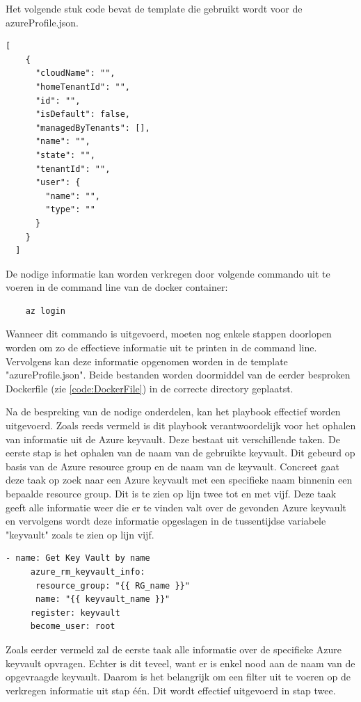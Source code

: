 Het volgende stuk code bevat de template die gebruikt wordt voor de azureProfile.json.
\begin{lstlisting}[caption={azureProfile.json}]
    [
    {
      "cloudName": "",
      "homeTenantId": "",
      "id": "",
      "isDefault": false,
      "managedByTenants": [],
      "name": "",
      "state": "",
      "tenantId": "",
      "user": {
        "name": "",
        "type": ""
      }
    }
  ]
\end{lstlisting}
De nodige informatie kan worden verkregen door volgende commando uit te voeren in de command line van de docker container: 
\begin{lstlisting}
    az login
\end{lstlisting}
Wanneer dit commando is uitgevoerd, moeten nog enkele stappen doorlopen worden om zo de effectieve informatie uit te printen in de command line. Vervolgens kan deze informatie opgenomen worden in de template "azureProfile.json". Beide bestanden worden doormiddel van de eerder besproken Dockerfile (zie \ref{code:DockerFile}) in de correcte directory geplaatst.

Na de bespreking van de nodige onderdelen, kan het playbook effectief worden uitgevoerd. Zoals reeds vermeld is dit playbook verantwoordelijk voor het ophalen van informatie uit de Azure keyvault. Deze bestaat uit verschillende taken. 
De eerste stap is het ophalen van de naam van de gebruikte keyvault. Dit gebeurd op basis van de Azure resource group en de naam van de keyvault. Concreet gaat deze taak op zoek naar een Azure keyvault met een specifieke naam binnenin een bepaalde resource group. Dit is te zien op lijn twee tot en met vijf. 
Deze taak geeft alle informatie weer die er te vinden valt over de gevonden Azure keyvault en vervolgens wordt deze informatie opgeslagen in de tussentijdse variabele "keyvault" zoals te zien op lijn vijf.
\begin{lstlisting}[caption={Playbook keyvault.yml, task get info keyvault}]
   - name: Get Key Vault by name
     azure_rm_keyvault_info:
      resource_group: "{{ RG_name }}"
      name: "{{ keyvault_name }}"
     register: keyvault
     become_user: root

\end{lstlisting}

Zoals eerder vermeld zal de eerste taak alle informatie over de specifieke Azure keyvault opvragen. Echter is dit teveel, want er is enkel nood aan de naam van de opgevraagde keyvault. Daarom is het belangrijk om een filter uit te voeren op de verkregen informatie uit stap één. Dit wordt effectief uitgevoerd in stap twee. 

